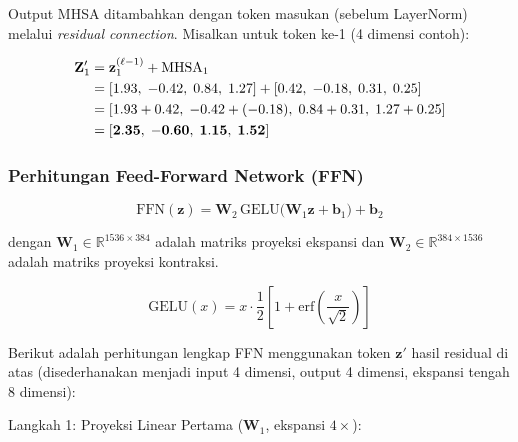 \noindent
Output MHSA ditambahkan dengan token masukan (sebelum LayerNorm)
melalui \textit{residual connection}. Misalkan untuk token ke-1
(4 dimensi contoh):
 
\vspace{0.5cm}
\begin{align*}
  \mathbf{Z}'_1
  &= \mathbf{z}_1^{(\ell-1)} + \mathrm{MHSA}_1 \notag \\
  &= [1.93,\; -0.42,\; 0.84,\; 1.27]
   + [0.42,\; -0.18,\; 0.31,\; 0.25] \notag \\
  &= [1.93+0.42,\; -0.42+(-0.18),\; 0.84+0.31,\; 1.27+0.25] \notag \\
  &= [\mathbf{2.35},\; \mathbf{-0.60},\; \mathbf{1.15},\; \mathbf{1.52}]
\end{align*}
\vspace{0.5cm}
 
 
\subsubsection{Perhitungan Feed-Forward Network (FFN)}
 
\vspace{0.5cm}
\begin{equation}
  \mathrm{FFN}(\mathbf{z})
  = \mathbf{W}_2\,\mathrm{GELU}\!\bigl(\mathbf{W}_1\mathbf{z}+\mathbf{b}_1\bigr)
    +\mathbf{b}_2
\end{equation}
\vspace{0.5cm}

\noindent
dengan $\mathbf{W}_1\in\mathbb{R}^{1536\times 384}$ adalah matriks proyeksi ekspansi
dan $\mathbf{W}_2\in\mathbb{R}^{384\times 1536}$ adalah matriks proyeksi kontraksi.
\vspace{0.5cm}
 
\begin{equation}
  \mathrm{GELU}(x)
  = x\cdot\frac{1}{2}\!\left[1+\mathrm{erf}\!\left(\frac{x}{\sqrt{2}}\right)\right]
\end{equation}
\vspace{0.5cm}
 
\noindent
Berikut adalah perhitungan lengkap FFN menggunakan token $\mathbf{z}'$
hasil residual di atas (disederhanakan menjadi input 4 dimensi,
output 4 dimensi, ekspansi tengah 8 dimensi):
 
\vspace{0.5cm}
\noindent Langkah 1: Proyeksi Linear Pertama
($\mathbf{W}_1$, ekspansi $4\times$):
 

